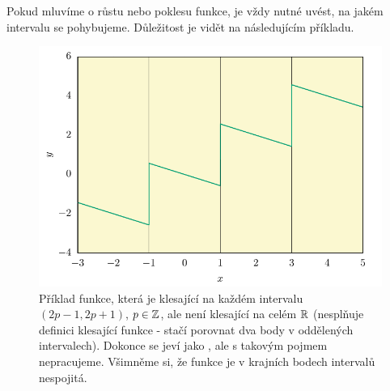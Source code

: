 \begin{remark}
    Pokud mluvíme o růstu nebo poklesu funkce, je vždy nutné uvést, na jakém intervalu se pohybujeme. Důležitost je vidět na následujícím příkladu.

    \begin{figure}[H]
        \centering
        \includegraphics[scale = 0.7]{Gnuplot/Figures/periodicka-klesajici.pdf}
        \caption{Příklad funkce, která je klesající na každém intervalu $(2p-1,2p+1)$, $p \in \mathbb{Z}$, ale není klesající na celém $\mathbb{R}$ (nesplňuje definici klesající funkce - stačí porovnat dva body v oddělených intervalech). Dokonce se jeví jako , ale s takovým pojmem nepracujeme. Všimněme si, že funkce je v krajních bodech intervalů nespojitá.}
    \end{figure}

\end{remark}

